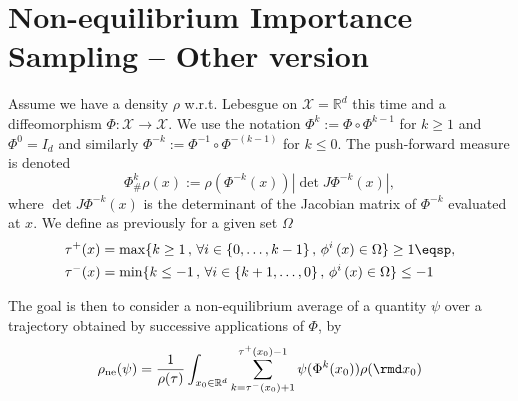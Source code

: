\section{Non-equilibrium Importance Sampling -- Other version}

Assume we have a density $\rho$ w.r.t. Lebesgue on $\mathcal{X}=\mathbb{R}^{d}$ this time
and a diffeomorphism $\Phi:\mathcal{X\rightarrow X}.$ We use the
notation $\Phi^{k}:=\Phi\circ\Phi^{k-1}$ for $k\geq1$ and $\Phi^{0}=I_{d}$
and similarly $\Phi^{-k}:=\Phi^{-1}\circ\Phi^{-(k-1)}$ for $k\leq0$.
The push-forward measure is denoted
\[
\Phi_{\#}^{k}\rho(x):=\rho(\Phi^{-k}\left(x\right))|\det J\Phi^{-k}\left(x\right)|,
\] 
where $\det J\Phi^{-k}\left(x\right)$ is the determinant of the Jacobian matrix of $\Phi^{-k}$ evaluated at $x$. We define as previously for a given set $\Omega$
\begin{align*}
    &\tau^{+}(x)=\max\{k\geq1\,, \, \forall i\in \{0,\dots, k-1\}\,,\, \phi^{i}\left(x\right)\in \Omega\}\geq1 \eqsp,\\
    &\tau^{-}(x)=\min\{k\leq-1\,, \, \forall i\in \{k+1,\dots,0\}\,,\, \phi^{i}\left(x\right)\in \Omega\}\leq-1
\end{align*}


The goal is then to consider a non-equilibrium average of a quantity $\psi$ over a trajectory obtained by successive applications of $\Phi$, by 
\begin{align}
\label{eq:non-eq_average_our}
    \rho_{\mathrm{ne}}(\psi) =  
    \frac{1}{\rho(\tau)}\int_{x_0\in \mathbb{R}^{d}} 
   \sum_{k=\tau^-(x_0)+1}^{\tau^+(x_0)-1}\psi(\Phi^k(x_0))\rho(\rmd x_0) 
\end{align}

